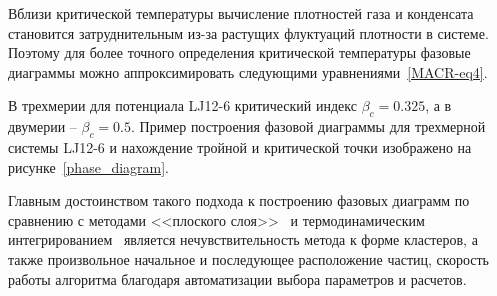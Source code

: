 \begin{table}[h!]
  \caption{Значения тройных и критических точек, а также коэффициентов фитирования $A$ и $a$ из уравнений \eqref{MACR-eq4} для двумерных и трехмерных систем Леннарда-Джонса, рассматриваемых в данной работе.}
  \label{PRIMe-Table2}
\end{table}



Вблизи критической температуры вычисление плотностей газа и конденсата становится затруднительным из-за растущих флуктуаций плотности в системе.
Поэтому для более точного определения критической температуры фазовые диаграммы можно аппроксимировать следующими уравнениями~\ref{MACR-eq4}.

В трехмерии для потенциала LJ12-6 критический индекс $\beta_c = 0.325$, а в двумерии -- $\beta_c = 0.5$.
Пример построения фазовой диаграммы для трехмерной системы LJ12-6 и нахождение тройной и критической точки изображено на рисунке~\ref{phase_diagram}.

Главным достоинством такого подхода к построению фазовых диаграмм по сравнению с методами <<плоского слоя>>~\cite{10.1021/jp806127j, 10.1021/jp1117213} и термодинамическим интегрированием~\cite{10.1088/0953-8984/21/46/465104} является нечувствительность метода к форме кластеров, а также произвольное начальное и последующее расположение частиц, скорость работы алгоритма благодаря автоматизации выбора параметров и расчетов.



